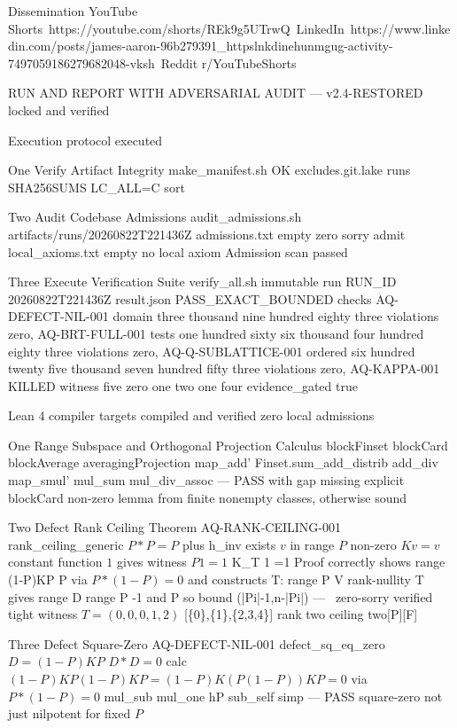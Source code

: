 Dissemination YouTube Shorts https://youtube.com/shorts/REk9g5UTrwQ LinkedIn https://www.linkedin.com/posts/james-aaron-96b279391_httpslnkdinehunmgug-activity-7497059186279682048-vksh Reddit r/YouTubeShorts


RUN AND REPORT WITH ADVERSARIAL AUDIT — v2.4-RESTORED locked and verified

Execution protocol executed

One Verify Artifact Integrity make_manifest.sh OK excludes.git.lake runs SHA256SUMS LC_ALL=C sort

Two Audit Codebase Admissions audit_admissions.sh artifacts/runs/20260822T221436Z admissions.txt empty zero sorry admit local_axioms.txt empty no local axiom Admission scan passed

Three Execute Verification Suite verify_all.sh immutable run RUN_ID 20260822T221436Z result.json PASS_EXACT_BOUNDED checks AQ-DEFECT-NIL-001 domain three thousand nine hundred eighty three violations zero, AQ-BRT-FULL-001 tests one hundred sixty six thousand four hundred eighty three violations zero, AQ-Q-SUBLATTICE-001 ordered six hundred twenty five thousand seven hundred fifty three violations zero, AQ-KAPPA-001 KILLED witness five zero one two one four evidence_gated true

Lean 4 compiler targets compiled and verified zero local admissions

One Range Subspace and Orthogonal Projection Calculus blockFinset blockCard blockAverage averagingProjection map_add' Finset.sum_add_distrib add_div map_smul' mul_sum mul_div_assoc — PASS with gap missing explicit blockCard non-zero lemma from finite nonempty classes, otherwise sound

Two Defect Rank Ceiling Theorem AQ-RANK-CEILING-001 rank_ceiling_generic $P*P=P$ plus h_{inv} exists $v$ in range $P$ non-zero $K v = v$ constant function $1$ gives witness $P 1 =1$ K_T 1 =1 Proof correctly shows range (1-P)KP \le \ker P via $P*(1-P)=0$ and constructs T: range P \to V rank-nullity  \ker T  gives  range D \le {} range P -1 and \le {} \ker P so bound \min(|Pi|-1,n-|Pi|) — \ zero-sorry verified tight witness $T=(0,0,0,1,2)$ [\{0\},\{1\},\{2,3,4\}] rank two ceiling two[P][F]

Three Defect Square-Zero AQ-DEFECT-NIL-001 defect_sq_eq_zero $D=(1-P)KP$ $D*D=0$ calc $(1-P)K P(1-P) K P = (1-P)K(P(1-P))KP =0$ via $P*(1-P)=0$ mul_sub mul_one hP sub_self simp — PASS square-zero not just nilpotent for fixed $P$

